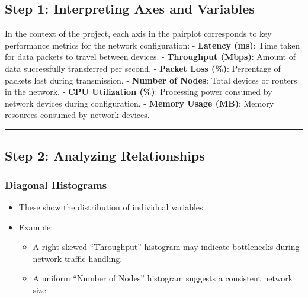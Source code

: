 \documentclass[11pt]{article}
\providecommand{\tightlist}{%
      \setlength{\itemsep}{0pt}\setlength{\parskip}{0pt}}
\begin{document}
\hypertarget{step-1-interpreting-axes-and-variables}{%
\subsection{\texorpdfstring{\textbf{Step 1: Interpreting Axes and
Variables}}{Step 1: Interpreting Axes and Variables}}\label{step-1-interpreting-axes-and-variables}}

In the context of the project, each axis in the pairplot corresponds to
key performance metrics for the network configuration: - \textbf{Latency
(ms)}: Time taken for data packets to travel between devices. -
\textbf{Throughput (Mbps)}: Amount of data successfully transferred per
second. - \textbf{Packet Loss (\%)}: Percentage of packets lost during
transmission. - \textbf{Number of Nodes}: Total devices or routers in
the network. - \textbf{CPU Utilization (\%)}: Processing power consumed
by network devices during configuration. - \textbf{Memory Usage (MB)}:
Memory resources consumed by network devices.

\begin{center}\rule{0.5\linewidth}{0.5pt}\end{center}

\hypertarget{step-2-analyzing-relationships}{%
\subsection{\texorpdfstring{\textbf{Step 2: Analyzing
Relationships}}{Step 2: Analyzing Relationships}}\label{step-2-analyzing-relationships}}

\hypertarget{diagonal-histograms}{%
\subsubsection{\texorpdfstring{\textbf{Diagonal
Histograms}}{Diagonal Histograms}}\label{diagonal-histograms}}

\begin{itemize}
\tightlist
\item
  These show the distribution of individual variables.
\item
  Example:

  \begin{itemize}
  \tightlist
  \item
    A right-skewed ``Throughput'' histogram may indicate bottlenecks
    during network traffic handling.
  \item
    A uniform ``Number of Nodes'' histogram suggests a consistent
    network size.
  \end{itemize}
\end{itemize}
\end{document}

